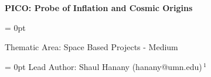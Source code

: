 \documentclass[PICOAPC.tex]{subfiles}
\begin{document}
%
%
\LARGE{ \centerline{\bf{PICO: Probe of Inflation and Cosmic Origins}}}
%

\parindent = 0pt

\vspace{4pt}
\large{Thematic Area: Space Based Projects - Medium}

\vspace{2pt}
\parindent = 0pt
\normalsize{ Lead Author: Shaul Hanany (hanany@umn.edu)\,$^{1}$ } 

\vspace{-0.06in} 

\label{authorlist}

\vspace{6pt}
\end{document}
